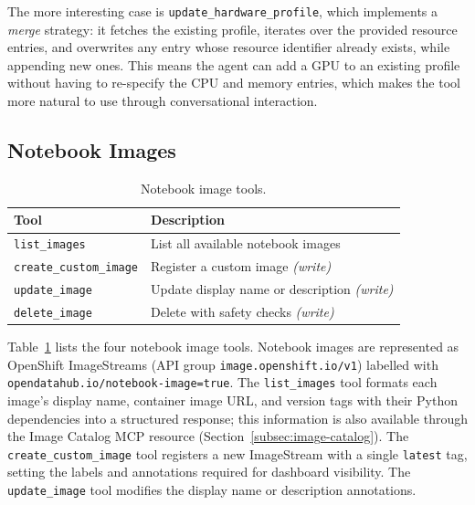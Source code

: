 \documentclass[
  digital,     %
  oneside,     %
  nosansbold,  %
  nocolorbold, %
  lof,         %
  lot,         %
]{fithesis4}
\begin{document}
The more interesting case is \texttt{update\_hardware\_profile}, which
implements a \emph{merge} strategy: it fetches the existing
profile, iterates over the provided resource entries, and overwrites
any entry whose resource identifier already exists, while appending new
ones. This means the agent can add a GPU to an existing profile without
having to re-specify the CPU and memory entries, which makes the tool
more natural to use through conversational interaction.

\subsection{Notebook Images}
\label{subsec:image-tools}

\begin{table}[!htbp]
\caption{Notebook image tools.}
\label{tab:tools-images}
\small
\begin{tabularx}{\textwidth}{lX}
\toprule
\textbf{Tool} & \textbf{Description} \\
\midrule
\texttt{list\_images}          & List all available notebook images \\
\texttt{create\_custom\_image} & Register a custom image \textit{(write)} \\
\texttt{update\_image}         & Update display name or description \textit{(write)} \\
\texttt{delete\_image}         & Delete with safety checks \textit{(write)} \\
\bottomrule
\end{tabularx}
\end{table}

\begin{sloppypar}
Table~\ref{tab:tools-images} lists the four notebook image tools.
Notebook images are represented as OpenShift ImageStreams (API group
\texttt{image.openshift.io/v1}) labelled with
\texttt{opendatahub.io/\allowbreak notebook-image=true}. The
\texttt{list\_images} tool formats each image's display name, container
image URL, and version tags with their Python dependencies into a
structured response; this information is also available through the
Image Catalog MCP resource (Section~\ref{subsec:image-catalog}). The
\texttt{create\_custom\_image} tool registers a new ImageStream with a
single \texttt{latest} tag, setting the labels and annotations required
for dashboard visibility. The \texttt{update\_image} tool modifies the
display name or description annotations.
\end{sloppypar}
\end{document}
